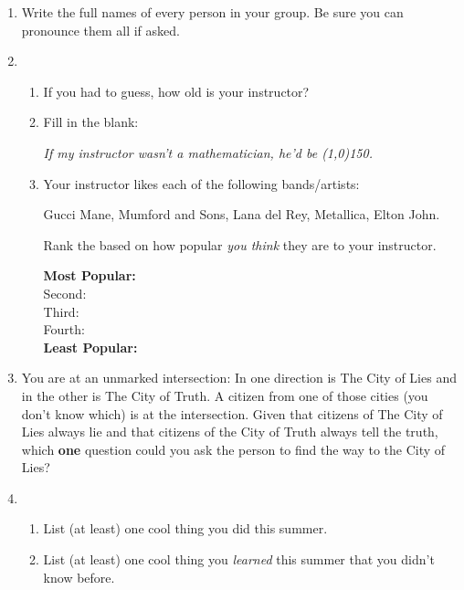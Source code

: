 \documentclass[12 pt]{article}
\newcommand{\ti}[1]{\textit{#1}}
\begin{document}
\begin{enumerate}[leftmargin=-0.25in, rightmargin=-0.25in]
\item Write the full names of every person in your group. Be sure you can pronounce them all if asked.\vspace{0.125in}

\item \begin{enumerate}
\item If you had to guess, how old is your instructor?\vspace{0.125in}
\item Fill in the blank:\begin{addmargin}[2mm]{0mm}\textit{If my instructor wasn't a mathematician, he'd be \line(1,0){150}.}\end{addmargin}\vspace{0.125in}
\item Your instructor likes each of the following bands/artists:\begin{center}Gucci Mane, Mumford and Sons, Lana del Rey, Metallica, Elton John.\end{center} Rank the based on how popular \ti{you think} they are to your instructor. \begin{addmargin}[1em]{4in}\begin{flushright}\textbf{Most Popular:}\\Second:\\ Third:\\ Fourth:\\\textbf{Least Popular:}\end{flushright}\vspace{0.0625in}\end{addmargin}
\end{enumerate}

\item You are at an unmarked intersection: In one direction is The City of Lies and in the other is The City of Truth. A citizen from one of those cities (you don't know which) is at the intersection. Given that citizens of The City of Lies always lie and that citizens of the City of Truth always tell the truth, which \textbf{one} question could you ask the person to find the way to the City of Lies?\vspace{0.25in}

\item \begin{enumerate}
	\item List (at least) one cool thing you did this summer.\vspace{0.125in}
	\item List (at least) one cool thing you \ti{learned} this summer that you didn't know before.\vspace{0.25in}
\end{enumerate}


\end{enumerate}
\end{document}
